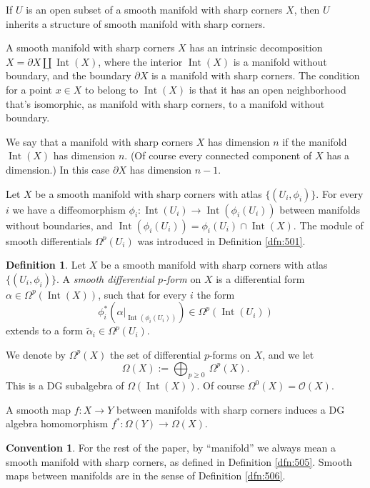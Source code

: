 \documentclass[10pt, a4paper]{amsart}
\theoremstyle{definition}
\newtheorem{dfn}[equation]{Definition}
\newtheorem{conv}[equation]{Convention}
\numberwithin{equation}{section}
\newcommand{\opn}{\operatorname}
\newcommand{\mcal}[1]{\mathcal{#1}}
\newcommand{\til}[1]{\tilde{#1}}
\begin{document}
If $U$ is an open subset of a smooth manifold with sharp corners $X$, then $U$
inherits a structure of smooth manifold with sharp corners.

A smooth manifold with sharp corners $X$  has an intrinsic
decomposition $X = \partial X \coprod \opn{Int} (X)$, where the interior
$\opn{Int} (X)$ is a manifold without boundary, and the
boundary $\partial X$ is a manifold with sharp corners.
The condition for a
point $x \in X$ to belong to $\opn{Int} (X)$ is that it has an open
neighborhood that's isomorphic, as manifold with sharp corners, to a manifold
without boundary.

We say that a manifold with sharp corners $X$ has dimension $n$ if 
the manifold $\opn{Int} (X)$ has dimension $n$. (Of course every connected
component of $X$ has a dimension.)  In this case $\partial X$ has dimension
$n-1$.

Let $X$ be a smooth manifold with sharp corners with atlas 
$\{ (U_i, \phi_i) \}$. For every $i$ we have a diffeomorphism
$\phi_i : \opn{Int}(U_i) \to  \opn{Int}(\phi_i(U_i))$
between manifolds without boundaries, and
$\opn{Int}(\phi_i(U_i)) = \phi_i(U_i) \cap \opn{Int} (X)$.
The module of smooth differentials $\Omega^p(U_i)$ was introduced in Definition 
\ref{dfn:501}.

\begin{dfn}  \label{dfn:511}
Let $X$ be a smooth manifold with sharp corners with atlas 
$\{ (U_i, \phi_i) \}$.
A {\em smooth differential $p$-form} on $X$ is a differential form
$\alpha \in \Omega^p(\opn{Int} (X))$, such that for every $i$ 
the form 
\[ \phi_i^* (\alpha|_{\opn{Int}(\phi_i(U_i))}) \in \Omega^p(\opn{Int}(U_i)) \]
extends to a form $\til{\alpha}_i \in \Omega^p(U_i)$.
\end{dfn}

We denote by $\Omega^p(X)$ the set of differential $p$-forms on
$X$, and we let 
\[ \Omega(X) := \bigoplus_{p \geq 0} \ \Omega^p(X) . \]
This is a DG subalgebra of $\Omega(\opn{Int}(X))$. 
Of course $\Omega^0(X) = \mcal{O}(X)$.

A smooth map $f : X \to Y$ between manifolds with sharp corners induces a DG
algebra homomorphism 
$f^* : \Omega(Y) \to \Omega(X)$.

\begin{conv} \label{conv:500}
For the rest of the paper, by ``manifold'' we always mean a smooth manifold
with sharp corners, as defined in Definition \ref{dfn:505}. 
Smooth maps between manifolds are in the sense of  Definition \ref{dfn:506}. 
\end{conv}
\end{document}
